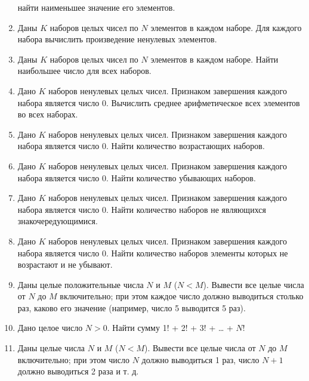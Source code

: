 \begin{enumerate}
найти наименьшее значение его элементов.
\item Даны $K$ наборов целых чисел по $N$ элементов в каждом наборе. Для каждого набора вычислить произведение ненулевых
элементов.
\item Даны $K$ наборов целых чисел по $N$ элементов в каждом наборе. Найти наибольшее число для всех наборов.
\item Дано $K$ наборов ненулевых целых чисел. Признаком завершения каждого набора является число 0. Вычислить среднее
арифметическое всех элементов во всех наборах.
\item Дано $K$ наборов ненулевых целых чисел. Признаком завершения каждого набора является число 0. Найти количество
возрастающих наборов.
\item Дано $K$ наборов ненулевых целых чисел. Признаком завершения каждого набора является число 0. Найти количество
убывающих наборов.
\item Дано $K$ наборов ненулевых целых чисел. Признаком завершения каждого набора является число 0. Найти количество
наборов не являющихся знакочередующимися.
\item Дано $K$ наборов ненулевых целых чисел. Признаком завершения каждого набора является число 0. Найти количество
наборов элементы которых не возрастают и не убывают.
\item Даны целые положительные числа $N$ и $M$ ($N<M$). Вывести все целые числа от $N$ до $M$ включительно; при этом
каждое число должно выводиться столько раз, каково его значение (например, число 5 выводится 5 раз).
\item Дано целое число $N>0$. Найти сумму 1! + 2! + 3! + … + $N$!
\item Даны целые числа $N$ и $M$ ($N<M$). Вывести все целые числа от $N$ до $M$ включительно; при этом число $N$ должно
выводиться 1 раз, число $N + 1$ должно выводиться 2 раза и т. д.
\end{enumerate}
